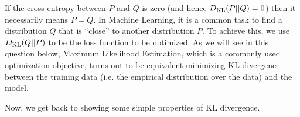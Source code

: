 If the cross entropy between $P$ and $Q$ is zero (and hence $D_{\text{KL}}(P||Q) = 0$) then it necessarily
means $P = Q$. In Machine Learning, it is a common task to find a distribution $Q$ that is ``close'' to
another distribution $P$. To achieve this, we use $D_{\text{KL}}(Q||P)$ to be the loss function to be optimized.
As we will see in this question below, Maximum Likelihood Estimation, which is a commonly used
optimization objective, turns out to be equivalent minimizing KL divergence between the training data
(i.e. the empirical distribution over the data)
and the model.

Now, we get back to showing some simple properties of KL divergence.

\begin{enumerate}

  

  

  

\end{enumerate}
